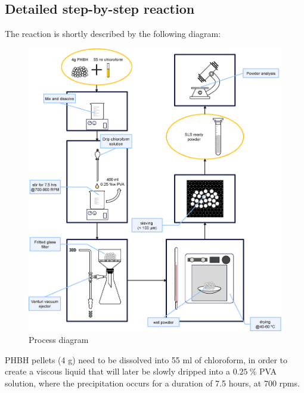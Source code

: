 \documentclass{article}
\begin{document}
        \clearpage



        \subsection{Detailed step-by-step reaction\label{detailed_reaction}}

        The reaction is shortly described by the following diagram: 

            \begin{figure}[h!]
                \centering
                \includegraphics[width=\textwidth]{Pictures/process_diagram.eps}
                \caption{Process diagram \autocite{Inkscape}}
                \label{fig:process_diagram}
            \end{figure}

        \clearpage

        PHBH pellets (4 g) need to be dissolved into 55 ml of chloroform, in order to create a viscous liquid that will later be slowly dripped into a 
        $0.25 \ \%$ PVA solution, where the precipitation occurs for a duration of 7.5 hours, at 700 rpms. \\ 
\end{document}
